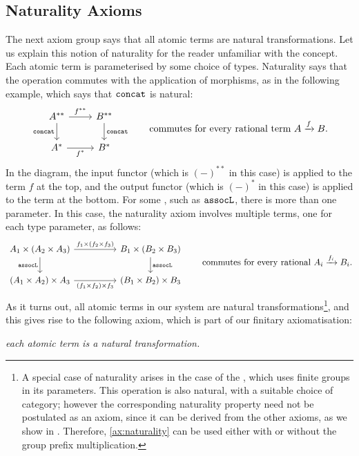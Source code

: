\subsection{Naturality Axioms}
\label{sec:naturality-axioms}
The next axiom group says that all atomic terms are natural transformations. Let us explain this notion of naturality for the reader unfamiliar with the concept. Each atomic term is parameterised by some choice of types. Naturality says that the operation commutes with the application of morphisms, as in the following example, which says that $\mathtt{concat}$ is natural:
\[
\begin{tikzcd}
A^{**} \arrow[r, "f^{**}"] \arrow[d, "\concatterm"'] & B^{**} \arrow[d, "\concatterm"] \\
A^* \arrow[r, "f^*"'] & B^*
\end{tikzcd}
\qquad \text{commutes for every rational term } A \xrightarrow{f} B.
\]
In the diagram, the input functor (which is $(-)^{**}$ in this case) is applied to the term $f$ at the top, and the output functor (which is $(-)^*$ in this case) is applied to the term at the bottom. 
For some , such as $\mathtt{assocL}$, there is more than one  parameter. In this case, the naturality axiom involves multiple terms, one for each type parameter, as follows:
\[
\begin{tikzcd}[column sep=huge]
    A_1 \times (A_2 \times A_3) \arrow[r, "f_1 \times (f_2 \times f_3)"] \arrow[d, "\assoclterm"'] & B_1 \times (B_2 \times B_3) \arrow[d, "\assoclterm"] \\
    (A_1 \times A_2) \times A_3 \arrow[r, "(f_1 \times f_2) \times f_3"'] & (B_1 \times B_2) \times B_3 
\end{tikzcd}
\qquad \text{commutes for every rational } A_i \xrightarrow{f_i} B_i.
\]
As it turns out, all atomic terms in our system are natural transformations\footnote{\label{fn:naturality-of-group-prefix-operation}A special case of naturality arises in the case of the , which uses finite groups in its parameters. This operation is also natural, with a suitable choice of category; however the corresponding naturality property need not be postulated as an axiom, since it can be derived from the other axioms, as we  show in . Therefore, \cref{ax:naturality} can be used either with or without the group prefix multiplication.
}, and this gives rise to the following axiom, which is part of our finitary axiomatisation:
\begin{axiom}
    \label{ax:naturality}
    \textit{each atomic term is a natural transformation.}
\end{axiom}

